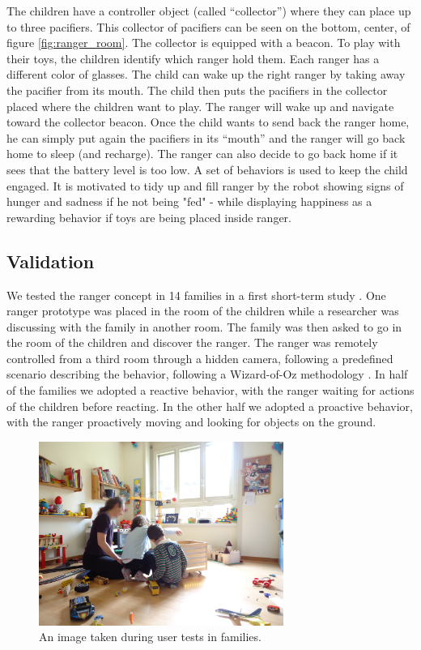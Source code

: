 \documentclass{sig-alternate}
\begin{document}
The children have a controller object (called ``collector'') where they can
place up to three pacifiers.  This collector of pacifiers can be seen on the
bottom, center, of figure \ref{fig:ranger_room}.  The collector is equipped with
a beacon.  To play with their toys, the children identify which ranger hold
them. Each ranger has a different color of glasses.  The child can wake up the
right ranger by taking away the pacifier from its mouth.  The child then puts
the pacifiers in the collector placed where the children want to play.  The
ranger will wake up and navigate toward the collector beacon.  Once the child
wants to send back the ranger home, he can simply put again the pacifiers in its
``mouth'' and the ranger will go back home to sleep (and recharge).  The ranger
can also decide to go back home if it sees that the battery level is too low.  A
set of behaviors is used to keep the child engaged.  It is motivated to tidy up
and fill ranger by the robot showing signs of hunger and sadness if he not being
"fed" - while displaying happiness as a rewarding behavior if toys are being
placed inside ranger.

\subsection{Validation}
\label{sec:validation} 

We tested the ranger concept in 14 families in a first short-term study
\cite{Fink2014}.  One ranger prototype was placed in the room of the children
while a researcher was discussing with the family in another room.  The family
was then asked to go in the room of the children and discover the ranger.  The
ranger was remotely controlled from a third room through a hidden camera,
following a predefined scenario describing the behavior, following a
Wizard-of-Oz methodology \cite{green1985rapid}.  In half of the families we
adopted a reactive behavior, with the ranger waiting for actions of the children
before reacting.  In the other half we adopted a proactive behavior, with the
ranger proactively moving and looking for objects on the ground.

\begin{figure}[ht]
 \centering
    \includegraphics[height=6cm]{family-ranger.jpg}
  \caption{An image taken during user tests in families.}
  \label{fig:validation} 
\end{figure}
\end{document}
